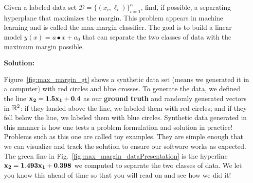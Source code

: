 \begin{example}
\label{ex:MaxMarginClassifier}
Given a labeled data set $\mathcal{D} = \{(x_i,\ell_i)\}_{i=1}^n$, find, if possible, a separating hyperplane that maximizes the margin. This problem appears in machine learning and is called the max-margin classifier. The goal is to build a linear model $y(x) = a \bullet x + a_0$ that can separate the two classes of data with the maximum margin possible. 

\end{example}

\textbf{Solution:}

Figure~\ref{fig:max_margin_gt} shows a synthetic data set (means we generated it in a computer) with red circles and blue crosses. To generate the data, we defined the line $\bf x_2 = 1.5 x_1 + 0.4$ as our \textbf{ground truth} and randomly generated vectors in $\mathbb R^2$: if they landed above the line, we labeled them with red circles; and if they fell below the line, we labeled them with blue circles. Synthetic data generated in this manner is how one tests a problem formulation and solution in practice!\\

Problems such as this one are called toy examples. They are simple enough that we can visualize and track the solution to ensure our software works as expected. The green line in Fig.~\ref{fig:max_margin_dataPresentation} is the hyperline $\bf x_2 = 1.493 x_1 + 0.398$ we computed to separate the two classes of data. We let you know this ahead of time so that you will read on and see how we did it!\\


